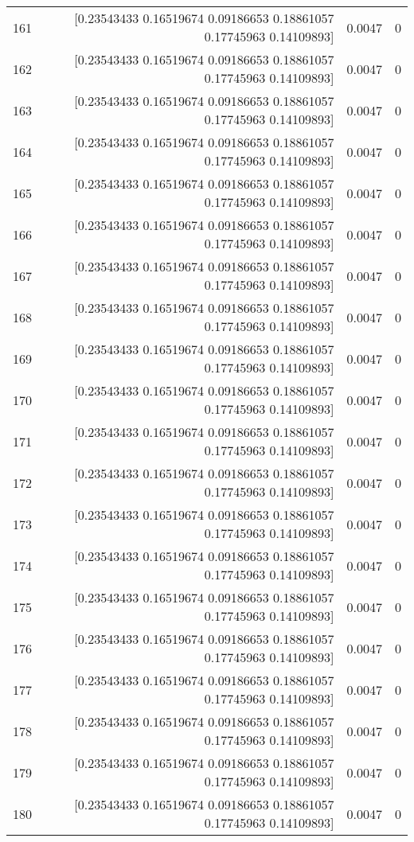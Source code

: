 \begin{longtable}{lrrr}
161 & [0.23543433 0.16519674 0.09186653 0.18861057 0.17745963 0.14109893] & 0.0047 & 0 \\
162 & [0.23543433 0.16519674 0.09186653 0.18861057 0.17745963 0.14109893] & 0.0047 & 0 \\
163 & [0.23543433 0.16519674 0.09186653 0.18861057 0.17745963 0.14109893] & 0.0047 & 0 \\
164 & [0.23543433 0.16519674 0.09186653 0.18861057 0.17745963 0.14109893] & 0.0047 & 0 \\
165 & [0.23543433 0.16519674 0.09186653 0.18861057 0.17745963 0.14109893] & 0.0047 & 0 \\
166 & [0.23543433 0.16519674 0.09186653 0.18861057 0.17745963 0.14109893] & 0.0047 & 0 \\
167 & [0.23543433 0.16519674 0.09186653 0.18861057 0.17745963 0.14109893] & 0.0047 & 0 \\
168 & [0.23543433 0.16519674 0.09186653 0.18861057 0.17745963 0.14109893] & 0.0047 & 0 \\
169 & [0.23543433 0.16519674 0.09186653 0.18861057 0.17745963 0.14109893] & 0.0047 & 0 \\
170 & [0.23543433 0.16519674 0.09186653 0.18861057 0.17745963 0.14109893] & 0.0047 & 0 \\
171 & [0.23543433 0.16519674 0.09186653 0.18861057 0.17745963 0.14109893] & 0.0047 & 0 \\
172 & [0.23543433 0.16519674 0.09186653 0.18861057 0.17745963 0.14109893] & 0.0047 & 0 \\
173 & [0.23543433 0.16519674 0.09186653 0.18861057 0.17745963 0.14109893] & 0.0047 & 0 \\
174 & [0.23543433 0.16519674 0.09186653 0.18861057 0.17745963 0.14109893] & 0.0047 & 0 \\
175 & [0.23543433 0.16519674 0.09186653 0.18861057 0.17745963 0.14109893] & 0.0047 & 0 \\
176 & [0.23543433 0.16519674 0.09186653 0.18861057 0.17745963 0.14109893] & 0.0047 & 0 \\
177 & [0.23543433 0.16519674 0.09186653 0.18861057 0.17745963 0.14109893] & 0.0047 & 0 \\
178 & [0.23543433 0.16519674 0.09186653 0.18861057 0.17745963 0.14109893] & 0.0047 & 0 \\
179 & [0.23543433 0.16519674 0.09186653 0.18861057 0.17745963 0.14109893] & 0.0047 & 0 \\
180 & [0.23543433 0.16519674 0.09186653 0.18861057 0.17745963 0.14109893] & 0.0047 & 0 \\

\end{longtable}
